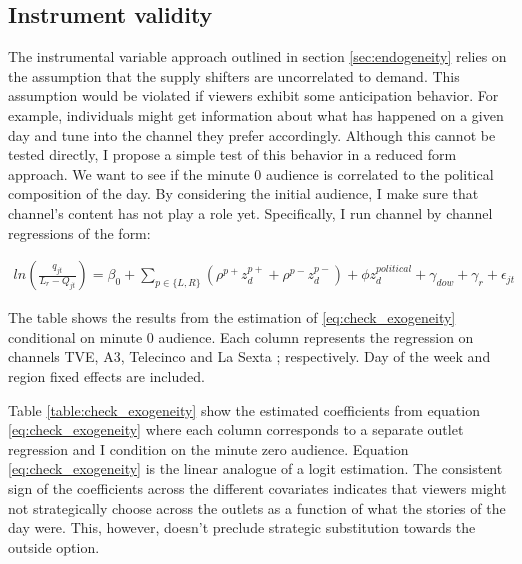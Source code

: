 \documentclass[12pt]{article}
\begin{document}
	
	
	
	
	
	
		\subsection{Instrument validity}
	
	
	The instrumental variable approach outlined in section \ref{sec:endogeneity} relies on the assumption that the supply shifters are uncorrelated to demand. This assumption would be violated if viewers exhibit some anticipation behavior. For example, individuals might get information about what has happened on a given day and tune into the channel they prefer accordingly. Although this cannot be tested directly, I propose a simple test of this behavior in a reduced form approach. We want to see if the minute 0 audience is correlated to the political composition of the day. By considering the initial audience, I make sure that channel's content has not play a role yet. Specifically, I run channel by channel regressions of the form: 
	
	\begin{equation}\label{eq:check_exogeneity}
		\begin{aligned}
			ln\left( \frac{q_{jt}}{L_{r}-Q_{jt}}  \right) = \beta_0 + \sum_{p \in \{L,R\}}\left(\rho^{p+} z^{p+}_d + \rho^{p-} z^{p-}_d \right)+ \phi z^{political}_d + \gamma_{dow} + \gamma_r + \epsilon_{jt}
		\end{aligned}
	\end{equation} 
	
	
	
	
	\begin{table}
		\centering
		
		\caption{The table shows the results from the estimation of \ref{eq:check_exogeneity} conditional on minute 0 audience. Each column represents the regression on channels TVE, A3, Telecinco and La Sexta ; respectively. Day of the week and region fixed effects are included. }
		\label{table:check_exogeneity}
	\end{table}
	
	
	Table \ref{table:check_exogeneity} show the estimated coefficients from equation \ref{eq:check_exogeneity} where each column corresponds to a separate outlet regression and I condition on the minute zero audience. Equation \ref{eq:check_exogeneity} is the linear analogue of a logit estimation. The consistent sign of the coefficients across the different covariates indicates that viewers might not strategically choose across the outlets as a function of what the stories of the day were. This, however, doesn't preclude strategic substitution towards the outside option. 
	
\end{document}
